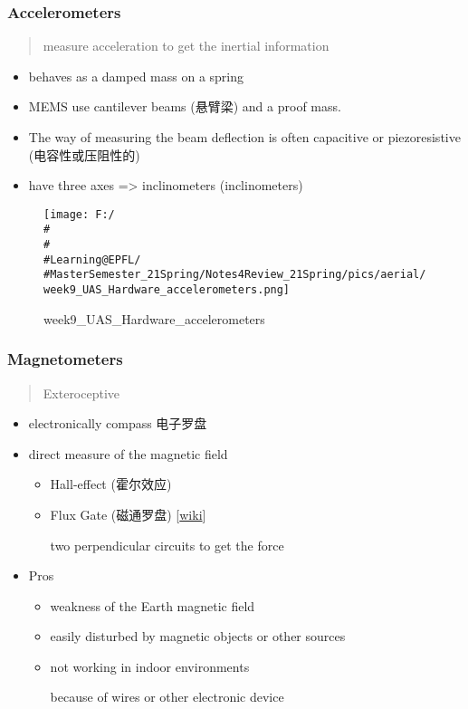 \documentclass[]{article}
\begin{document}
\subsubsection{Accelerometers}\label{header-n2216}

\begin{quote}
measure acceleration to get the inertial information
\end{quote}

\begin{itemize}
\item
  behaves as a damped mass on a spring
\item
  MEMS use cantilever beams (悬臂梁) and a proof mass.
\item
  The way of measuring the beam deflection is often capacitive or
  piezoresistive (电容性或压阻性的)
\item
  have three axes =\textgreater{} inclinometers (inclinometers)
\end{itemize}

\begin{figure}
\centering
\texttt{[image: F:/\\\#\\\#\\\#Learning@EPFL/\\\#MasterSemester\_21Spring/Notes4Review\_21Spring/pics/aerial/week9\_UAS\_Hardware\_accelerometers.png]}
\caption{week9\_UAS\_Hardware\_accelerometers}
\end{figure}

\subsubsection{Magnetometers}\label{header-n2229}

\begin{quote}
Exteroceptive
\end{quote}

\begin{itemize}
\item
  electronically compass 电子罗盘
\item
  direct measure of the magnetic field

  \begin{itemize}
  \item
    Hall-effect (霍尔效应)
  \item
    Flux Gate (磁通罗盘)
    {[}\href{https://en.wikipedia.org/wiki/Magnetometer\#Fluxgate_magnetometer}{wiki}{]}

    two perpendicular circuits to get the force
  \end{itemize}
\item
  Pros

  \begin{itemize}
  \item
    weakness of the Earth magnetic field
  \item
    easily disturbed by magnetic objects or other sources
  \item
    not working in indoor environments

    because of wires or other electronic device
  \end{itemize}
\end{itemize}
\end{document}
